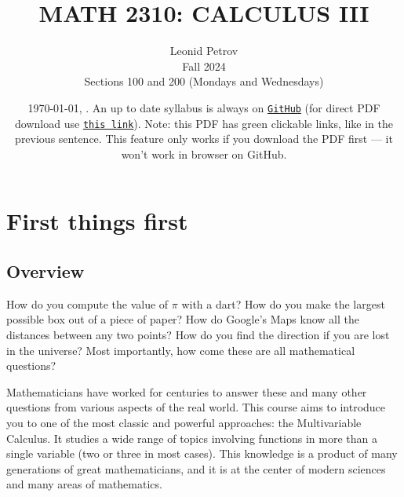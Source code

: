 \documentclass[oneside,11pt]{amsart}
\begin{document}
\title[MATH 2310: CALCULUS III]{MATH 2310: CALCULUS III}
\author{Leonid Petrov\\Fall 2024\\Sections 100 and 200 (Mondays and Wednesdays)}
\date{\today, \currenttime. An up to date syllabus is always on \href{https://github.com/lenis2000/Syllabi/blob/master/Syllabus_2310_f24.pdf}{\textcolor{green!70!black}{\texttt{GitHub}}} (for direct PDF download use \href{https://github.com/lenis2000/Syllabi/raw/master/Syllabus_2310_f24.pdf}{\textcolor{green!70!black}{\texttt{this link}}}). Note: this PDF has green clickable links, like in the previous sentence. This feature only works if you download the PDF first — it won’t work in browser on GitHub.}
\maketitle

\setcounter{tocdepth}{3}

\section{First things first}

\subsection{Overview}

How do you compute the value of $\pi$ with a dart? How do you make the largest possible box out of a piece of paper? How do Google's Maps know all the distances between any two points? How do you find the direction if you are lost in the universe? Most importantly, how come these are all mathematical questions?

Mathematicians have worked for centuries to answer these and many other questions from various aspects of the real world. This course aims to introduce you to one of the most classic and powerful approaches: the Multivariable Calculus. It studies a wide range of topics involving functions in more than a single variable (two or three in most cases). This knowledge is a product of many generations of great mathematicians, and it is at the center of modern sciences and many areas of mathematics. 
\end{document}
